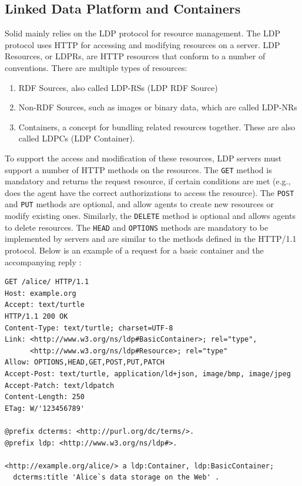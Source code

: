 \subsection{Linked Data Platform and Containers}
\label{subsec:ldp}
Solid mainly relies on the LDP protocol \citep{ldp} for resource management. The LDP protocol uses HTTP for accessing and modifying resources on a server. LDP Resources, or LDPRs, are HTTP resources that conform to a number of conventions. There are multiple types of resources:
\begin{enumerate}
    \item RDF Sources, also called LDP-RSs (LDP RDF Source)
    \item Non-RDF Sources, such as images or binary data, which are called LDP-NRs
    \item Containers, a concept for bundling related resources together. These are also called LDPCs (LDP Container). 
\end{enumerate}

\noindent To support the access and modification of these resources, LDP servers must support a number of HTTP methods on the resources. The \texttt{GET} method is mandatory and returns the request resource, if certain conditions are met (e.g., does the agent have the correct authorizations to access the resource). The \texttt{POST} and \texttt{PUT} methods are optional, and allow agents to create new resources or modify existing ones. Similarly, the \texttt{DELETE} method is optional and allows agents to delete resources. The \texttt{HEAD} and \texttt{OPTIONS} methods are mandatory to be implemented by servers and are similar to the methods defined in the HTTP/1.1 protocol. Below is an example of a request for a basic container and the accompanying reply \citep{ldp-primer}:

\begin{verbatim}
GET /alice/ HTTP/1.1
Host: example.org
Accept: text/turtle
HTTP/1.1 200 OK 
Content-Type: text/turtle; charset=UTF-8
Link: <http://www.w3.org/ns/ldp#BasicContainer>; rel="type", 
      <http://www.w3.org/ns/ldp#Resource>; rel="type"
Allow: OPTIONS,HEAD,GET,POST,PUT,PATCH
Accept-Post: text/turtle, application/ld+json, image/bmp, image/jpeg
Accept-Patch: text/ldpatch
Content-Length: 250
ETag: W/'123456789'
	
@prefix dcterms: <http://purl.org/dc/terms/>.
@prefix ldp: <http://www.w3.org/ns/ldp#>.
	
<http://example.org/alice/> a ldp:Container, ldp:BasicContainer;
  dcterms:title 'Alice`s data storage on the Web' .	
\end{verbatim}

